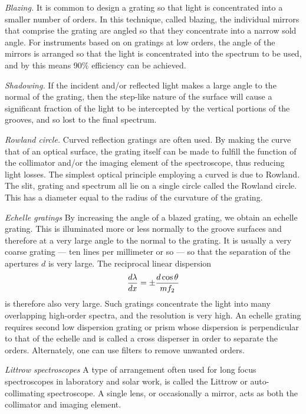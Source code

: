 \documentclass{article}
\begin{document}
\noindent
{\it Blazing.} It is common to design a grating so that light is concentrated into a smaller
number of orders. In this technique, called blazing, the individual mirrors that comprise
the grating are angled so that they concentrate into a narrow sold angle. For instruments
based on on gratings at low orders, the angle of the mirrors is arranged so that the light
is concentrated into the spectrum to be used, and by this means 90\% efficiency can be
achieved. 

\noindent
{\it Shadowing.} If the incident and/or reflected light makes a large angle to the normal of
the grating, then the step-like nature of the surface will cause a significant fraction 
of the light to be intercepted by the vertical portions of the grooves, and so lost to the final spectrum. 

\noindent
{\it Rowland circle.} Curved reflection gratings are often used. By making the curve that of
an optical surface, the grating itself can be made to fulfill the function of the collimator
and/or the imaging element of the spectroscope, thus reducing light losses. The simplest optical principle employing a curved is due to Rowland. The slit, grating and 
spectrum all lie on a single circle called the Rowland circle. This has a diameter equal
to the radius of the curvature of the grating. 

\noindent
{\it Echelle gratings} By increasing the angle of a blazed grating, we obtain an echelle 
grating. This is illuminated more or less normally to the groove surfaces and therefore at
a very large angle to the normal to the grating. It is usually a very coarse grating ---
ten lines per millimeter or so --- so that the separation of the apertures $d$ is very large. The reciprocal linear dispersion
\[
{d\lambda\over dx}=\pm{d\cos\theta\over mf_2}
\]
is therefore also very large. Such gratings concentrate the light into many overlapping high-order spectra, and the resolution is very high. An echelle grating requires second
low dispersion grating or prism whose dispersion is perpendicular to that of the echelle
and is called a cross disperser in order to separate the orders. Alternately, one can use filters to remove unwanted orders.

\noindent
{\it Littrow spectroscopes} A type of arrangement often used for long focus spectroscopes in laboratory and solar work, is called the Littrow or auto-collimating spectroscope. A single lens, or occasionally a mirror, acts as both the collimator and imaging element.
\end{document}
